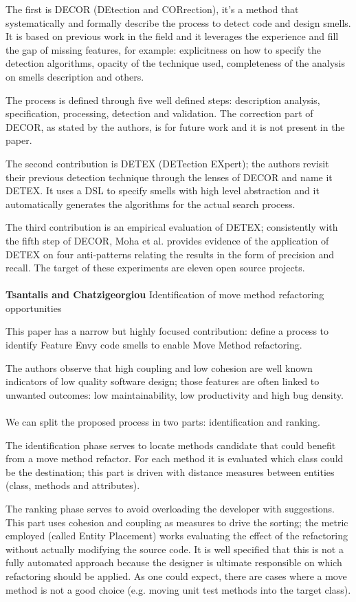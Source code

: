 The first is DECOR (DEtection and CORrection), it's a method that systematically and formally describe the process to detect code and design smells. It is based on previous work in the field and it leverages the experience and fill the gap of missing features, for example: explicitness on how to specify the detection algorithms, opacity of the technique used, completeness of the analysis on smells description and others. 

The process is defined through five well defined steps: description analysis, specification, processing, detection and validation. The correction part of DECOR, as stated by the authors, is for future work and it is not present in the paper.

The second contribution is DETEX (DETection EXpert); the authors revisit their previous detection technique through the lenses of DECOR and name it DETEX. It uses a DSL to specify smells with high level abstraction and it automatically generates the algorithms for the actual search process. 

The third contribution is an empirical evaluation of DETEX; consistently with the fifth step of DECOR, Moha et al. provides evidence of the application of DETEX on four anti-patterns relating the results in the form of precision and recall. The target of these experiments are eleven open source projects. 
\\
\\
\textbf{Tsantalis and Chatzigeorgiou} \cite{tsantalis2009identification} Identification of move method refactoring opportunities

This paper has a narrow but highly focused contribution: define a process to identify Feature Envy code smells to enable Move Method refactoring.

The authors observe that high coupling and low cohesion are well known indicators of low quality software design; those features are often linked to unwanted outcomes: low maintainability, low productivity and high bug density. 
\\
\\
We can split the proposed process in two parts: identification and ranking.

The identification phase serves to locate methods candidate that could benefit from a move method refactor. For each method it is evaluated which class could be the destination; this part is driven with distance measures between entities (class, methods and attributes).

The ranking phase serves to avoid overloading the developer with suggestions. This part uses cohesion and coupling as measures to drive the sorting; the metric employed (called Entity Placement) works evaluating the effect of the refactoring without actually modifying the source code.
It is well specified that this is not a fully automated approach because the designer is ultimate responsible on which refactoring should be applied. As one could expect, there are cases where a move method is not a good choice (e.g. moving unit test methods into the target class).

